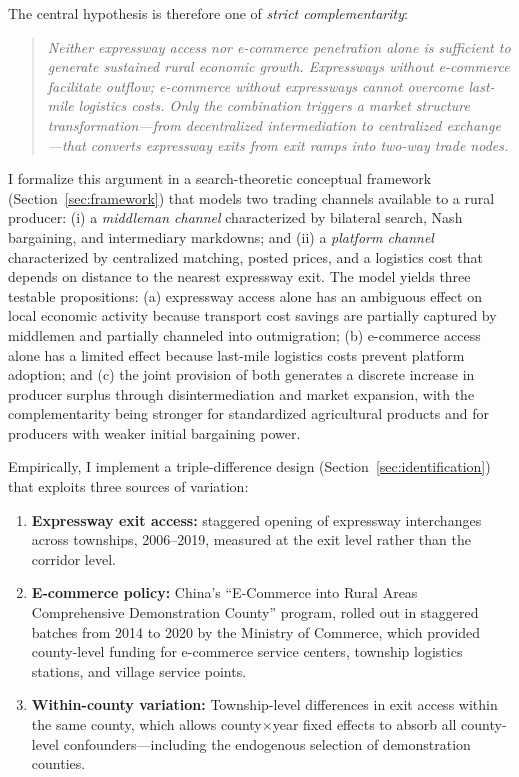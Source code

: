 \documentclass[12pt]{article}
\begin{document}
The central hypothesis is therefore one of \textit{strict complementarity}:

\begin{quote}
\textit{Neither expressway access nor e-commerce penetration alone is sufficient to generate sustained rural economic growth. Expressways without e-commerce facilitate outflow; e-commerce without expressways cannot overcome last-mile logistics costs. Only the combination triggers a market structure transformation---from decentralized intermediation to centralized exchange---that converts expressway exits from exit ramps into two-way trade nodes.}
\end{quote}

I formalize this argument in a search-theoretic conceptual framework (Section~\ref{sec:framework}) that models two trading channels available to a rural producer: (i) a \textit{middleman channel} characterized by bilateral search, Nash bargaining, and intermediary markdowns; and (ii) a \textit{platform channel} characterized by centralized matching, posted prices, and a logistics cost that depends on distance to the nearest expressway exit. The model yields three testable propositions: (a) expressway access alone has an ambiguous effect on local economic activity because transport cost savings are partially captured by middlemen and partially channeled into outmigration; (b) e-commerce access alone has a limited effect because last-mile logistics costs prevent platform adoption; and (c) the joint provision of both generates a discrete increase in producer surplus through disintermediation and market expansion, with the complementarity being stronger for standardized agricultural products and for producers with weaker initial bargaining power.

Empirically, I implement a triple-difference design (Section~\ref{sec:identification}) that exploits three sources of variation:

\begin{enumerate}[nosep]
    \item \textbf{Expressway exit access:} staggered opening of expressway interchanges across townships, 2006--2019, measured at the exit level rather than the corridor level.
    \item \textbf{E-commerce policy:} China's ``E-Commerce into Rural Areas Comprehensive Demonstration County'' program, rolled out in staggered batches from 2014 to 2020 by the Ministry of Commerce, which provided county-level funding for e-commerce service centers, township logistics stations, and village service points.
    \item \textbf{Within-county variation:} Township-level differences in exit access within the same county, which allows county$\times$year fixed effects to absorb all county-level confounders---including the endogenous selection of demonstration counties.
\end{enumerate}
\end{document}
